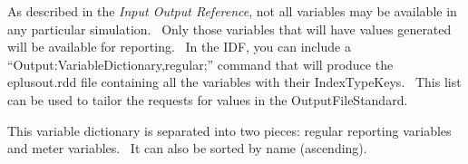 As described in the \emph{Input Output Reference}, not all variables may be available in any particular simulation.~ Only those variables that will have values generated will be available for reporting.~ In the IDF, you can include a ``Output:VariableDictionary,regular;'' command that will produce the eplusout.rdd file containing all the variables with their IndexTypeKeys.~ This list can be used to tailor the requests for values in the OutputFileStandard.

This variable dictionary is separated into two pieces: regular reporting variables and meter variables.~ It can also be sorted by name (ascending).
